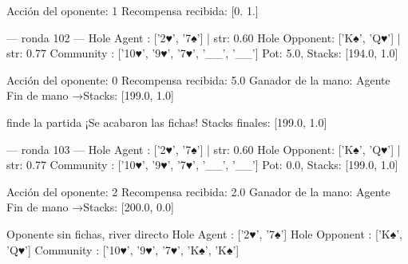Acción del oponente: 1
Recompensa recibida: [0. 1.]

--- ronda 102 ---
Hole Agent : ['2♥', '7♠'] | str: 0.60
Hole Opponent: ['K♠', 'Q♥'] | str: 0.77
Community  : ['10♥', '9♥', '7♥', '__', '__']
Pot: 5.0, Stacks: [194.0, 1.0]

Acción del oponente: 0
Recompensa recibida: 5.0
Ganador de la mano: Agente
Fin de mano →Stacks: [199.0, 1.0]


finde la partida
¡Se acabaron las fichas!
Stacks finales: [199.0, 1.0]

--- ronda 103 ---
Hole Agent : ['2♥', '7♠'] | str: 0.60
Hole Opponent: ['K♠', 'Q♥'] | str: 0.77
Community  : ['10♥', '9♥', '7♥', '__', '__']
Pot: 0.0, Stacks: [199.0, 1.0]

Acción del oponente: 2
Recompensa recibida: 2.0
Ganador de la mano: Agente
Fin de mano →Stacks: [200.0, 0.0]


Oponente sin fichas, river directo
Hole Agent    : ['2♥', '7♠']
Hole Opponent : ['K♠', 'Q♥']
Community     : ['10♥', '9♥', '7♥', 'K♠', 'K♠']
